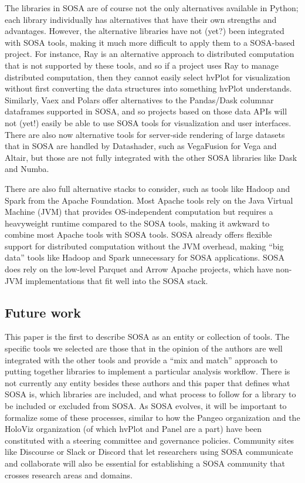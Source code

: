 The libraries in SOSA are of course not the only alternatives available in Python; each library individually has alternatives that have their own strengths and advantages. However, the alternative libraries have not (yet?) been integrated with SOSA tools, making it much more difficult to apply them to a SOSA-based project. For instance, Ray is an alternative approach to distributed computation that is not supported by these tools, and so if a project uses Ray to manage distributed computation, then they cannot easily select hvPlot for visualization without first converting the data structures into something hvPlot understands. Similarly, Vaex and Polars offer alternatives to the Pandas/Dask columnar dataframes supported in SOSA, and so projects based on those data APIs will not (yet!) easily be able to use SOSA tools for visualization and user interfaces. There are also now alternative tools for server-side rendering of large datasets that in SOSA are handled by Datashader, such as VegaFusion for Vega and Altair, but those are not fully integrated with the other SOSA libraries like Dask and Numba.

There are also full alternative stacks to consider, such as tools like Hadoop and Spark from the Apache Foundation. Most Apache tools rely on the Java Virtual Machine (JVM) that provides OS-independent computation but requires a heavyweight runtime compared to the SOSA tools, making it awkward to combine most Apache tools with SOSA tools. SOSA already offers flexible support for distributed computation without the JVM overhead, making ``big data'' tools like Hadoop and Spark unnecessary for SOSA applications. SOSA does rely on the low-level Parquet and Arrow Apache projects, which have non-JVM implementations that fit well into the SOSA stack.

\subsection{Future work}
This paper is the first to describe SOSA as an entity or collection of tools. The specific tools we selected are those that in the opinion of the authors are well integrated with the other tools and provide a ``mix and match'' approach to putting together libraries to implement a particular analysis workflow. There is not currently any entity besides these authors and this paper that defines what SOSA is, which libraries are included, and what process to follow for a library to be included or excluded from SOSA. As SOSA evolves, it will be important to formalize some of these processes, similar to how the Pangeo organization and the HoloViz organization (of which hvPlot and Panel are a part) have been constituted with a steering committee and governance policies. Community sites like Discourse or Slack or Discord that let researchers using SOSA communicate and collaborate will also be essential for establishing a SOSA community that crosses research areas and domains.

